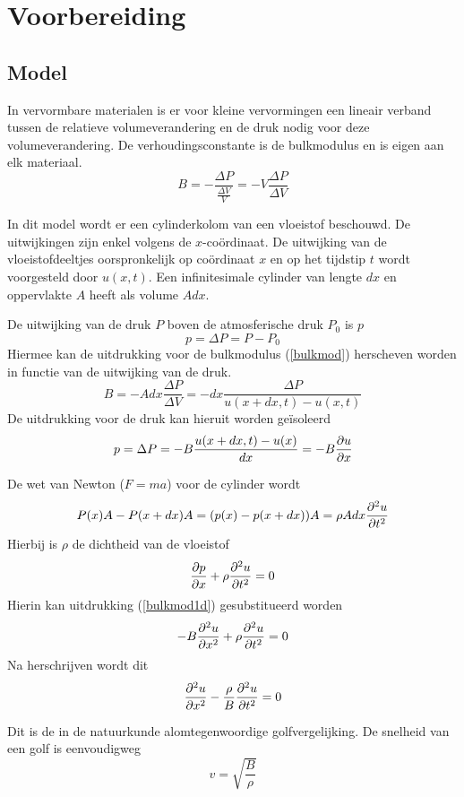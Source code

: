 \section{Voorbereiding}
\subsection{Model}

In vervormbare materialen is er voor kleine vervormingen een lineair verband 
tussen de relatieve volumeverandering en de druk nodig voor deze 
volumeverandering. De verhoudingsconstante is de bulkmodulus en is eigen aan 
elk materiaal.
\begin{equation}
\label{bulkmod}
B = -\frac{\Delta P}{\frac{\Delta V}{V}} = - V \frac{\Delta P}{\Delta V}
\end{equation}


In dit model wordt er een cylinderkolom van een vloeistof beschouwd. De 
uitwijkingen zijn enkel volgens de $x$-co\"ordinaat. De uitwijking van de 
vloeistofdeeltjes oorspronkelijk op co\"ordinaat $x$ en op het tijdstip $t$ 
wordt voorgesteld door $u(x,t)$. Een infinitesimale cylinder van lengte $dx$ en 
oppervlakte $A$ heeft als volume $A dx$. 

De uitwijking van de druk $P$ boven de atmosferische druk $P_0$ is $p$
$$
p = \Delta P = P - P_0
$$
Hiermee kan de uitdrukking voor de bulkmodulus (\ref{bulkmod}) herscheven 
worden in functie van de uitwijking van de druk.
$$
B = -A dx \frac{\Delta P}{\Delta V} = -dx \frac{\Delta P}{ u(x+dx,t)-u(x,t)}
$$
De uitdrukking voor de druk kan hieruit worden ge\"isoleerd
\begin{equation}
\label{bulkmod1d}
p = \Delta P = -B \frac{u(x+dx,t)-u(x)}{dx} = -B \frac{\partial u}{\partial x}
\end{equation}

De wet van Newton ($F = ma$) voor de cylinder wordt
$$
P(x)A - P(x+dx)A = (p(x) - p(x+dx))A = \rho A dx \frac{\partial^2 u}{\partial t^2}
$$
Hierbij is $\rho$ de dichtheid van de vloeistof
$$
\frac{\partial p}{\partial x} + \rho \frac{\partial^2 u}{\partial t^2} = 0
$$
Hierin kan uitdrukking (\ref{bulkmod1d}) gesubstitueerd worden
$$
-B\frac{\partial^2 u}{\partial x^2} + \rho \frac{\partial^2 u}{\partial t^2} = 0
$$
Na herschrijven wordt dit
\begin{equation}
\label{waveeq}
\frac{\partial^2 u}{\partial x^2} - \frac{\rho}{B} \frac{\partial^2 u}{\partial t^2} = 0
\end{equation}

Dit is de in de natuurkunde alomtegenwoordige golfvergelijking. De snelheid van 
een golf is eenvoudigweg
\begin{equation}
\label{speedofsound}
v = \sqrt{\frac{B}{\rho}}
\end{equation}

